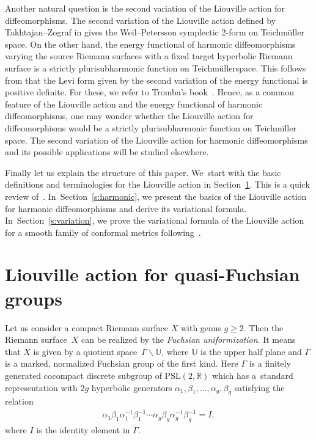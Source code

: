 \documentclass[10pt,a4paper]{amsart}
\numberwithin{equation}{section}
\newcommand{\bk}{\backslash}
\newcommand{\Te}{Teichm\"{u}ller\:}
\begin{document}
Another natural question is the second variation of the Liouville action for diffeomorphisms. The second variation of the Liouville action defined by Takhtajan--Zograf in \cite{TZ88-1, TZ88-2} gives
the Weil--Petersson symplectic 2-form on Teichm\"uller space. On the other hand, the energy functional of harmonic diffeomorphisms varying the source Riemann surfaces with a fixed target hyperbolic Riemann surface is a strictly plurisubharmonic function on \Te space. This follows from that the Levi form given by the second variation of the energy functional is positive definite. For these, we refer to Tromba's book~\cite{Tromba}. Hence, as a common feature of the Liouville action and the energy functional of harmonic diffeomorphisms, one may wonder whether the Liouville action for diffeomorphisms would be a strictly plurisubharmonic function on Teich\-m\"iller space. The second variation of the Liouville action for harmonic diffeomorphisms and its possible applications will be studied elsewhere.

Finally let us explain the structure of this paper. We~start with the basic definitions and ter\-minologies for the Liouville action in Section~\ref{sec2}. This is a quick review of~\cite[Section~2]{2}. In~Section~\ref{s:harmonic}, we present the basics of the Liouville action for harmonic diffeomorphisms and derive its variational formula. In~Section~\ref{s:variation}, we prove the variational formula of the Liouville action for a smooth family of conformal metrics following~\cite[Section~4]{2}.

\section{Liouville action for quasi-Fuchsian groups}\label{sec2}

Let us consider a compact Riemann surface $X$ with genus $g\geq 2$. Then the Riemann surface~$X$ can be realized by the \emph{Fuchsian uniformization}. It means that $X$ is given by
a quotient space~$\Gamma\bk\mathbb{U}$, where $\mathbb{U}$ is the upper half plane and $\Gamma$ is a marked, normalized Fuchsian group of the first kind. Here $\Gamma$ is a finitely generated cocompact discrete subgroup of $\text{PSL} (2, \mathbb{R})$ which has a~standard representation with $2g$ hyperbolic generators $\alpha_1, \beta_1, \ldots, \alpha_g, \beta_g$ satisfying the relation
\begin{gather*}
\alpha_1\beta_1\alpha_1^{-1}\beta_1^{-1}\cdots \alpha_g\beta_g\alpha_g^{-1}\beta_g^{-1}=I,
\end{gather*}
where $I$ is the identity element in $\Gamma$.
\end{document}
